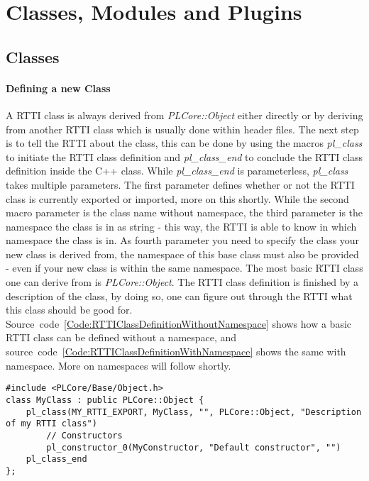 \section{Classes, Modules and Plugins}
\label{Chapter:ClassesModulesAndPlugins}



\subsection{Classes}
\paragraph{Defining a new Class}
A \ac{RTTI} class is always derived from \emph{PLCore::Object} either directly or by deriving from another \ac{RTTI} class which is usually done within header files. The next step is to tell the \ac{RTTI} about the class, this can be done by using the macros \emph{pl\_class} to initiate the \ac{RTTI} class definition and \emph{pl\_class\_end} to conclude the \ac{RTTI} class definition inside the C++ class. While \emph{pl\_class\_end} is parameterless, \emph{pl\_class} takes multiple parameters. The first parameter defines whether or not the \ac{RTTI} class is currently exported or imported, more on this shortly. While the second macro parameter is the class name without namespace, the third parameter is the namespace the class is in as string - this way, the \ac{RTTI} is able to know in which namespace the class is in. As fourth parameter you need to specify the class your new class is derived from, the namespace of this base class must also be provided - even if your new class is within the same namespace. The most basic \ac{RTTI} class one can derive from is \emph{PLCore::Object}. The \ac{RTTI} class definition is finished by a description of the class, by doing so, one can figure out through the \ac{RTTI} what this class should be good for. Source~code~\ref{Code:RTTIClassDefinitionWithoutNamespace} shows how a basic \ac{RTTI} class can be defined without a namespace, and source~code~\ref{Code:RTTIClassDefinitionWithNamespace} shows the same with namespace. More on namespaces will follow shortly.
\begin{lstlisting}[float=htb,label=Code:RTTIClassDefinitionWithoutNamespace,caption={Defining a new \ac{RTTI} class without namespace}]
#include <PLCore/Base/Object.h>
class MyClass : public PLCore::Object {
	pl_class(MY_RTTI_EXPORT, MyClass, "", PLCore::Object, "Description of my RTTI class")
		// Constructors
		pl_constructor_0(MyConstructor, "Default constructor", "")
	pl_class_end
};
\end{lstlisting}
